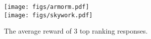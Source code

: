 \begin{figure}[t]
\centering
    
    \texttt{[image: figs/armorm.pdf]}
    \hspace{0.05\linewidth}
    \\
    
    \texttt{[image: figs/skywork.pdf]}
    \caption{The average reward of 3 top ranking responses. }
    \label{reward} 
    \vspace{-1em}
\end{figure}

